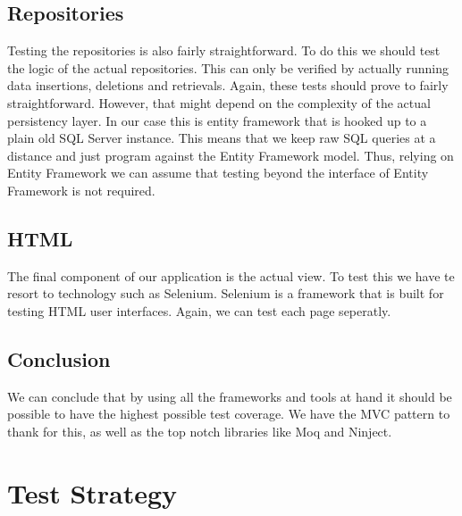 \documentclass[10pt,a4paper,BCOR12mm, headexclude, footexclude,
  twoside, openright]{scrartcl}
\numberwithin{equation}{section} %
\numberwithin{figure}{section} %
\numberwithin{table}{section} %
\begin{document}
\subsection{Repositories}
Testing the repositories is also fairly straightforward. To do this we should
test the logic of the actual repositories. This can only be verified by actually
running data insertions, deletions and retrievals. Again, these tests should
prove to fairly straightforward. However, that might depend on the complexity of
the actual persistency layer. In our case this is entity framework that is
hooked up to a plain old SQL Server instance. This means that we keep raw SQL
queries at a distance and just program against the Entity Framework model. Thus,
relying on Entity Framework we can assume that testing beyond the interface of
Entity Framework is not required.

\subsection{HTML}
The final component of our application is the actual view. To test this we have
te resort to technology such as Selenium. Selenium is a framework that is built
for testing HTML user interfaces. Again, we can test each page seperatly.

\subsection{Conclusion}
We can conclude that by using all the frameworks and tools at hand it should be
possible to have the highest possible test coverage. We have the MVC pattern to
thank for this, as well as the top notch libraries like Moq and Ninject.


\section{Test Strategy}
\end{document}
